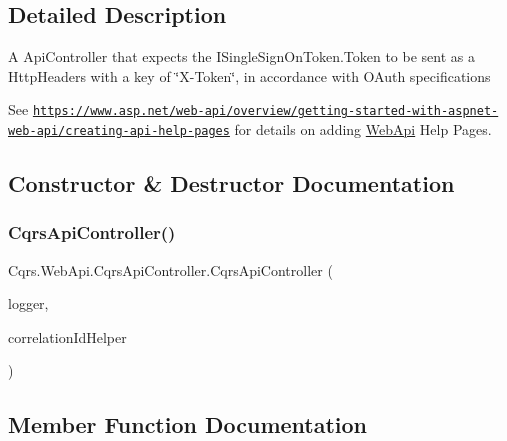 \subsection{Detailed Description}
A Api\+Controller that expects the I\+Single\+Sign\+On\+Token.\+Token to be sent as a Http\+Headers with a key of \char`\"{}\+X-\/\+Token\char`\"{}, in accordance with O\+Auth specifications 

See \href{https://www.asp.net/web-api/overview/getting-started-with-aspnet-web-api/creating-api-help-pages}{\tt https\+://www.\+asp.\+net/web-\/api/overview/getting-\/started-\/with-\/aspnet-\/web-\/api/creating-\/api-\/help-\/pages} for details on adding \hyperlink{namespaceCqrs_1_1WebApi}{Web\+Api} Help Pages. 

\subsection{Constructor \& Destructor Documentation}
\mbox{\label{classCqrs_1_1WebApi_1_1CqrsApiController_a83125cca7cbb61ac890d3a4115db2bdf}} 
\subsubsection{\texorpdfstring{Cqrs\+Api\+Controller()}{CqrsApiController()}}
{\footnotesize\ttfamily Cqrs.\+Web\+Api.\+Cqrs\+Api\+Controller.\+Cqrs\+Api\+Controller (\begin{DoxyParamCaption}\item[{I\+Logger}]{logger,  }\item[{I\+Correlation\+Id\+Helper}]{correlation\+Id\+Helper }\end{DoxyParamCaption})\hspace{0.3cm}{\ttfamily [protected]}}



\subsection{Member Function Documentation}
\mbox{\label{classCqrs_1_1WebApi_1_1CqrsApiController_add369c5b7779bc8d69c47bcc564ac086}} 
